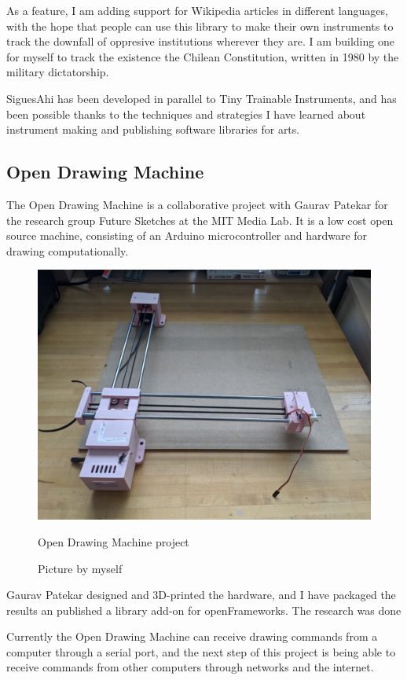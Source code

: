 As a feature, I am adding support for Wikipedia articles in different languages, with the hope that people can use this library to make their own instruments to track the downfall of oppresive institutions wherever they are. I am building one for myself to track the existence the Chilean Constitution, written in 1980 by the military dictatorship.

SiguesAhi has been developed in parallel to Tiny Trainable Instruments, and has been possible thanks to the techniques and strategies I have learned about instrument making and publishing software libraries for arts.

\subsection{Open Drawing Machine}

The Open Drawing Machine \cite{website-open-drawing-machine} is a collaborative project with Gaurav Patekar for the research group Future Sketches at the MIT Media Lab. It is a low cost open source machine, consisting of an Arduino microcontroller and hardware for drawing computationally.

\begin{figure}[ht]
  \centering
  \includegraphics[width=0.75\linewidth,height=0.25\textheight,keepaspectratio]{images/open-drawing-machine.jpg}
  \caption{Open Drawing Machine project}
  \caption*{Picture by myself}
  \label{fig:open-drawing-machine}
\end{figure}

Gaurav Patekar designed and 3D-printed the hardware, and I have packaged the results an published a library add-on for openFrameworks. The research was done 

Currently the Open Drawing Machine can receive drawing commands from a computer through a serial port, and the next step of this project is being able to receive commands from other computers through networks and the internet.

